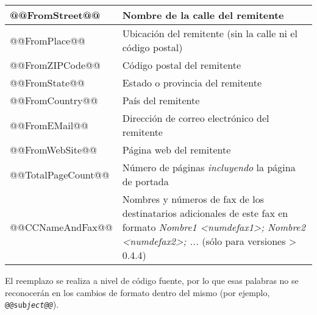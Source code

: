 \documentclass[a4paper,10pt]{scrartcl}
\begin{document}
\begin{center}
\begin{tabular}{|l|p{}|}
\ttfamily @@FromStreet@@ & Nombre de la calle del remitente \\\hline
\ttfamily @@FromPlace@@ & Ubicación del remitente (sin la calle ni el código postal)\\\hline
\ttfamily @@FromZIPCode@@ & Código postal del remitente \\\hline
\ttfamily @@FromState@@ & Estado o provincia del remitente\\\hline
\ttfamily @@FromCountry@@ & País del remitente\\\hline
\ttfamily @@FromEMail@@ & Dirección de correo electrónico del remitente\\\hline
\ttfamily @@FromWebSite@@ & Página web del remitente\\\hline
\ttfamily @@TotalPageCount@@ & Número de páginas \textit{incluyendo} la página de portada \\\hline
\ttfamily @@CCNameAndFax@@ & Nombres y números de fax de los destinatarios adicionales de este fax en formato \textit{Nombre1 <numdefax1>; Nombre2 <numdefax2>; ...} (sólo para versiones > 0.4.4)\\\hline
\end{tabular}
\end{center}

El reemplazo se realiza a nivel de código fuente, por lo que esas palabras no se reconocerán en los cambios de formato dentro del mismo (por ejemplo, \texttt{@@sub\textit{ject@@}}).
\end{document}
